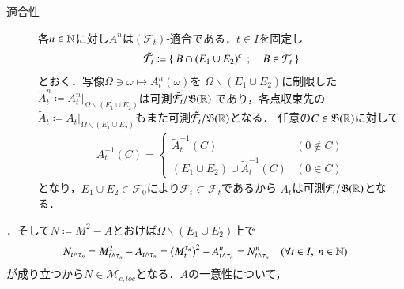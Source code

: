 \begin{prf}
\begin{description}
{\begin{description}
						\item[適合性]
							各$n \in \mathbb{N}$に対し$A^n$は$(\mathcal{F}_t)$-適合である．$t \in I$を固定し
							\begin{align}
								\tilde{\mathcal{F}}_t \coloneqq \left\{\ B \cap (E_1 \cup E_2)^c\ \, ; \quad B \in \mathcal{F}_t\ \right\}
							\end{align}
							とおく．写像$\Omega \ni \omega \longmapsto A_t^n(\omega)$を
							$\Omega \backslash (E_1 \cup E_2)$に制限した$\tilde{A}_t^n \coloneqq A_t^n|_{\Omega \backslash (E_1 \cup E_2)}$は可測$\tilde{\mathcal{F}}_t/\mathfrak{B}(\mathbb{R})$
							であり，各点収束先の$\tilde{A}_t \coloneqq A_t|_{\Omega \backslash (E_1 \cup E_2)}$もまた可測$\tilde{\mathcal{F}}_t/\mathfrak{B}(\mathbb{R})$となる．
							任意の$C \in \mathfrak{B}(\mathbb{R})$に対して
							\begin{align}
								A_t^{-1}(C) =
								\begin{cases}
									\tilde{A}_t^{-1}(C) & (0 \notin C) \\
									(E_1 \cup E_2) \cup \tilde{A}_t^{-1}(C) & (0 \in C)
								\end{cases}
							\end{align}
							となり，$E_1 \cup E_2 \in \mathcal{F}_0$により$\tilde{\mathcal{F}}_t \subset \mathcal{F}_t$であるから
							$A_t$は可測$\mathcal{F}_t/\mathfrak{B}(\mathbb{R})$となる．
					\end{description}
				}
				．そして$N \coloneqq M^2 - A$とおけば$\Omega \backslash (E_1 \cup E_2)$上で
				\begin{align}
					N_{t \wedge \tau_n} = M_{t \wedge \tau_n}^2 - A_{t \wedge \tau_n} 
					= \left( M_t^{\tau_n} \right)^2 - A_{t \wedge \tau_n}^n
					= N_{t \wedge \tau_n}^n \quad (\forall t \in I,\ n \in \mathbb{N})
				\end{align}
				が成り立つから$N \in \mathcal{M}_{c,loc}$となる．$A$の一意性について，
				

\end{description}
\end{prf}

